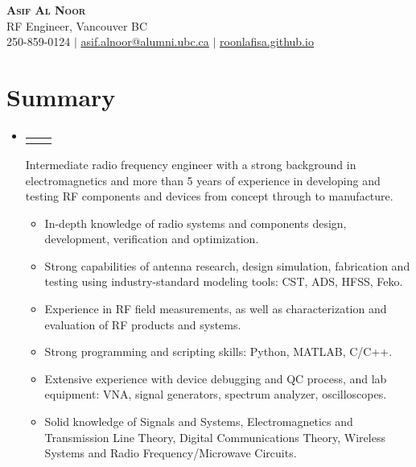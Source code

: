 \documentclass[letterpaper,11pt]{article}
\makeatletter
\newcommand{\resumeItem}[1]{
  \item\small{
    {#1 \vspace{-2pt}}
  }
}
\newcommand{\resumeProjectHeading}[2]{
    \item
    \begin{tabular*}{0.97\textwidth}{l@{\extracolsep{\fill}}r}
      \small#1 & #2 \\
    \end{tabular*}\vspace{-7pt}
}
\newcommand{\resumeSubHeadingListStart}{\begin{itemize}[leftmargin=0.15in, label={}]}
\newcommand{\resumeSubHeadingListEnd}{\end{itemize}}
\newcommand{\resumeItemListStart}{\begin{itemize}}
\newcommand{\resumeItemListEnd}{\end{itemize}\vspace{-5pt}}
\makeatother
\begin{document}


\begin{center}
    \textbf{\Huge \scshape Asif Al Noor} \\ \vspace{1pt}
     \small RF Engineer, Vancouver BC \\
    \small 250-859-0124 $|$ \href{mailto:asif.alnoor@alumni.ubc.ca}{\underline{asif.alnoor@alumni.ubc.ca}} $|$ 
    \href{https://roonlafisa.github.io/}{\underline{roonlafisa.github.io}}
\end{center}

\section{Summary}

\resumeSubHeadingListStart
    \resumeProjectHeading {}{}
    Intermediate radio frequency engineer with a strong background in electromagnetics and more than 5 years of experience in developing and testing RF components and devices from concept through to manufacture.
        \resumeItemListStart
        \resumeItem{In-depth knowledge of radio systems and components design, development, verification and optimization.}
        \resumeItem{Strong capabilities of antenna research, design simulation, fabrication and testing using industry-standard modeling tools: CST, ADS, HFSS, Feko.}
        \resumeItem{Experience in RF field measurements, as well as characterization and evaluation of RF products and systems.}
        \resumeItem{Strong programming and scripting skills: Python, MATLAB, C/C++.}
        \resumeItem{Extensive experience with device debugging and QC process, and lab equipment: VNA, signal generators, spectrum analyzer, oscilloscopes.}
        \resumeItem{Solid knowledge of Signals and Systems, Electromagnetics and Transmission Line Theory, Digital Communications Theory, Wireless Systems and Radio Frequency/Microwave Circuits.}
        \resumeItemListEnd
\resumeSubHeadingListEnd
\end{document}
